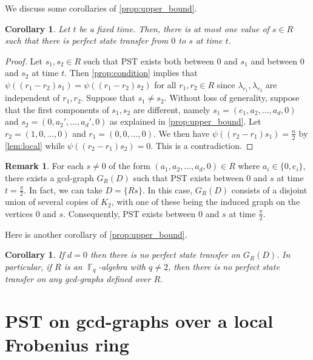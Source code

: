 \documentclass[12pt, a4paper]{amsart}
\newtheorem{cor}[thm]{Corollary}
\theoremstyle{definition}
\newtheorem{rem}[thm]{Remark}
\DeclareMathOperator{\F}{\mathbb{F}}
\numberwithin{equation}{section}
\begin{document}
We discuss some corollaries of \cref{prop:upper_bound}.
\begin{cor} \label{cor:number_of_pst}
Let $t$ be a fixed time. Then, there is at most one value of $s \in R$ such that there is perfect state transfer from $0$ to $s$ at time $t$. 
\end{cor}
\begin{proof}
Let $s_1, s_2 \in R$ such that PST exists both between $0$ and $s_1$ and between $0$ and $s_2$ at time $t.$ Then \cref{prop:condition} implies that $\psi((r_1-r_2)s_1) =\psi((r_1-r_2)s_2)$ for all $r_1, r_2 \in R$ since $\lambda_{r_1}, \lambda_{r_2}$ are independent of $r_1, r_2.$ Suppose that $s_1 \neq s_2.$ Without loss of generality, suppose that the first components of $s_1, s_2$ are different, namely $s_1 =(e_1, a_2, \ldots, a_d, 0)$ and $s_2 = (0, a_2', \ldots, a_d', 0)$ as explained in \cref{prop:upper_bound}. Let $r_2=(1, 0, \ldots, 0)$ and $r_1 = (0, 0, \ldots, 0)$. We then have $
\psi((r_2-r_1)s_1) = \frac{n}{2}$ by \cref{lem:local} while $\psi((r_2-r_1)s_2) =0$. This is a contradiction. 

\end{proof}

\begin{rem}
    For each $s \neq 0$ of the form $(a_1, a_2, \ldots, a_d,0) \in  R$ where $a_i \in \{0, e_i \}$, there exists a gcd-graph $G_{R}(D)$ such that PST exists between $0$ and $s$ at time $t= \frac{\pi}{2}.$ In fact, we can take $D=\{Rs\}$. In this case, $G_{R}(D)$ consists of a disjoint union of several copies of $K_2$, with one of these being the induced graph on the vertices $0$ and $s$. Consequently, PST exists between $0$ and $s$ at time $\frac{\pi}{2}$.
\end{rem}





Here is another corollary of \cref{prop:upper_bound}. 


\begin{cor}
\label{cor:no PST}
If $d=0$ then there is no perfect state transfer on $G_{R}(D).$ In particular, if $R$ is an $\F_q$-algebra with $q \neq 2$, then there is no perfect state transfer on any gcd-graphs defined over $R.$
\end{cor}

\section{\textbf{PST on gcd-graphs over a local Frobenius ring}} \label{sec:local_rings}
\end{document}
